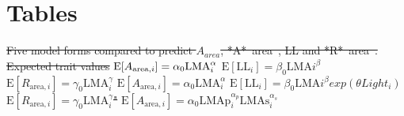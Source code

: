 \documentclass[
  12pt,
]{article}
\providecommand{\DIFdeltex}[1]{{\protect\color{red}\sout{#1}}}                      %
\providecommand{\DIFdelbegin}{} %
\providecommand{\DIFdel}[1]{\texorpdfstring{\DIFdeltex{#1}}{}} %
\newcommand{\DIFscaledelfig}{0.5}
\newlength{\DIFdelgraphicswidth} %
\newlength{\DIFdelgraphicsheight} %
\newcommand{\DIFdelincludegraphics}[2][]{%
\sbox{\DIFdelgraphicsbox}{\DIFOincludegraphics[#1]{#2}}%
\settoboxwidth{\DIFdelgraphicswidth}{\DIFdelgraphicsbox} %
\settoboxtotalheight{\DIFdelgraphicsheight}{\DIFdelgraphicsbox} %
\scalebox{\DIFscaledelfig}{%
\parbox[b]{\DIFdelgraphicswidth}{\usebox{\DIFdelgraphicsbox}\\[-\baselineskip] \rule{\DIFdelgraphicswidth}{0em}}\llap{\resizebox{\DIFdelgraphicswidth}{\DIFdelgraphicsheight}{%
\setlength{\unitlength}{\DIFdelgraphicswidth}%
\begin{picture}(1,1)%
\thicklines\linethickness{2pt} %
{\color[rgb]{1,0,0}\put(0,0){\framebox(1,1){}}}%
{\color[rgb]{1,0,0}\put(0,0){\line( 1,1){1}}}%
{\color[rgb]{1,0,0}\put(0,1){\line(1,-1){1}}}%
\end{picture}%
}\hspace*{3pt}}} %
} %
\DeclareRobustCommand{\DIFdelbegin}{\DIFOdelbegin \let\includegraphics\DIFdelincludegraphics} %
\begin{document}
\newpage

\hypertarget{tables}{%
\section{Tables}\label{tables}}

\DIFdelbegin %
{%
\DIFdel{Five model forms compared to predict $A_{area}$, *A*~area~, LL and *R*~area~.
      }}%
\DIFdel{Expected trait values}%
\DIFdel{\hspace{1em}$\mathrm{E}[A_{\mathrm{area} , i}] = \vphantom{1} \alpha_0\mathrm{LMA}_{i}^{\alpha}$}%
\DIFdel{\hspace{1em}$\mathrm{E}[\mathrm{LL}_i] = \beta_0\mathrm{LMA}{i}^{\beta}$}%
\DIFdel{\hspace{1em}$\mathrm{E}[R_{\mathrm{area} , i}] = \gamma_0\mathrm{LMA}_{i}^{\gamma}$}%
\DIFdel{\hspace{1em}$\mathrm{E}[A_{\mathrm{area} , i}] = \alpha_0\mathrm{LMA}_{i}^{\alpha}$}%
\DIFdel{\hspace{1em}$\mathrm{E}[\mathrm{LL}_i] = \beta_0\mathrm{LMA}{i}^{\beta}exp(\theta Light_i)$}%
\DIFdel{\hspace{1em}$\mathrm{E}[R_{\mathrm{area} , i}] = \gamma_0\mathrm{LMA}_{i}^{\gamma}$"}%
\DIFdel{\hspace{1em}$\mathrm{E}[A_{\mathrm{area} , i}] = \alpha_0\mathrm{LMAp}_{i}^{\alpha_p} \mathrm{LMAs}_{i}^{\alpha_s}$}%
\end{document}
